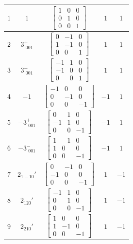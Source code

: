 \documentclass[fleqn,8pt]{jsarticle}
\begin{document}
\begin{longtable}{ccccc}
$ 1 $ & $ 1 $ & $ \begin{bmatrix} 1 & 0 & 0 \\ 0 & 1 & 0 \\ 0 & 0 & 1 \end{bmatrix} $ & $ 1 $ & $ 1 $ \\ \hline
$ 2 $ & $ 3^{+}_{\,\,001} $ & $ \begin{bmatrix} 0 & -1 & 0 \\ 1 & -1 & 0 \\ 0 & 0 & 1 \end{bmatrix} $ & $ 1 $ & $ 1 $ \\ \hline
$ 3 $ & $ 3^{-}_{\,\,001} $ & $ \begin{bmatrix} -1 & 1 & 0 \\ -1 & 0 & 0 \\ 0 & 0 & 1 \end{bmatrix} $ & $ 1 $ & $ 1 $ \\ \hline
$ 4 $ & $ -1 $ & $ \begin{bmatrix} -1 & 0 & 0 \\ 0 & -1 & 0 \\ 0 & 0 & -1 \end{bmatrix} $ & $ -1 $ & $ 1 $ \\ \hline
$ 5 $ & $ -3^{+}_{\,\,001} $ & $ \begin{bmatrix} 0 & 1 & 0 \\ -1 & 1 & 0 \\ 0 & 0 & -1 \end{bmatrix} $ & $ -1 $ & $ 1 $ \\ \hline
$ 6 $ & $ -3^{-}_{\,\,001} $ & $ \begin{bmatrix} 1 & -1 & 0 \\ 1 & 0 & 0 \\ 0 & 0 & -1 \end{bmatrix} $ & $ -1 $ & $ 1 $ \\ \hline
$ 7 $ & $ 2{}_{1-10}{}' $ & $ \begin{bmatrix} 0 & -1 & 0 \\ -1 & 0 & 0 \\ 0 & 0 & -1 \end{bmatrix} $ & $ 1 $ & $ -1 $ \\ \hline
$ 8 $ & $ 2{}_{120}{}' $ & $ \begin{bmatrix} -1 & 1 & 0 \\ 0 & 1 & 0 \\ 0 & 0 & -1 \end{bmatrix} $ & $ 1 $ & $ -1 $ \\ \hline
$ 9 $ & $ 2{}_{210}{}' $ & $ \begin{bmatrix} 1 & 0 & 0 \\ 1 & -1 & 0 \\ 0 & 0 & -1 \end{bmatrix} $ & $ 1 $ & $ -1 $ \\ \hline

\end{longtable}
\end{document}
